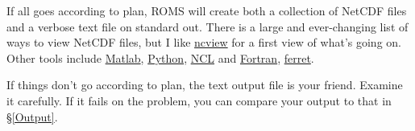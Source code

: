 \begin{itemize}
If all goes according to plan, ROMS will create both a collection
of NetCDF files and a verbose text file on standard out. There is a
large and ever-changing list of ways to view NetCDF files, but I like
\href{http://meteora.ucsd.edu/\~pierce/ncview\_home\_page.html}{ncview}
for a first view of what's going on.
Other tools include
\href{http://www.mathworks.com/products/matlab/}{Matlab},
\href{http://www.python.org/}{Python},
\href{http://www.ncl.ucar.edu/}{NCL} and
\href{https://www.myroms.org/wiki/index.php/Plotting_Package_Installation}{Fortran},
\href{http://www.ferret.noaa.gov/Ferret/}{ferret}.

If things don't go according to plan, the text output file is your
friend. Examine it carefully. If it fails on the 
problem, you can compare your output to that in \S\ref{Output}.


\end{itemize}

